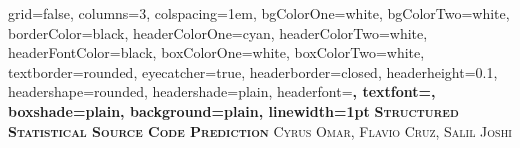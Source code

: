 \documentclass[landscape,final,paperwidth=40in,paperheight=32in,fontscale=0.33]{baposter}
\begin{document}

\begin{poster}%
  {
  grid=false,
  columns=3,
  colspacing=1em,
  bgColorOne=white,
  bgColorTwo=white,
  borderColor=black,
  headerColorOne=cyan,
  headerColorTwo=white,
  headerFontColor=black,
  boxColorOne=white,
  boxColorTwo=white,
  textborder=rounded,
  eyecatcher=true,
  headerborder=closed,
  headerheight=0.1\textheight,
  headershape=rounded,
  headershade=plain,
  headerfont=\Large\bf\textsc, %
  textfont={\setlength{\parindent}{1.5em}},
  boxshade=plain,
  background=plain,
  linewidth=1pt
  }
  {} 
  {\bf\textsc{Structured Statistical Source Code Prediction}\vspace{0.5em}}
  {\textsc{Cyrus Omar, Flavio Cruz, Salil Joshi}}
  {}

\newcommand{\asgn}{\textbf{assignment}}
\newcommand{\statement}{\textbf{statement}}
\newcommand{\argument}{\textbf{argument}}
\newcommand{\other}{\textbf{other}}

\newcommand{\lit}{\textbf{lit}}
\newcommand{\meth}{\textbf{meth}}
\newcommand{\var}{\textbf{var}}

\newcommand{\nm}[1]{\#\{#1\}}


\end{poster}
\end{document}
